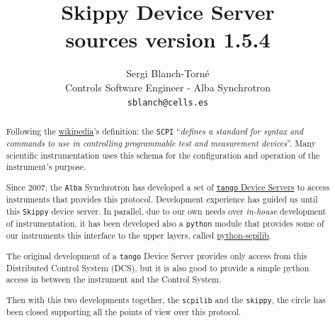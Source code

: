 \documentclass[a4paper,10pt]{article}
\title{Skippy Device Server \\
\large sources version 1.5.4}
\author{Sergi Blanch-Torn\'e\\\small{Controls Software Engineer - Alba Synchrotron}\\{\tt \small{sblanch@cells.es}}}
\begin{document}
\maketitle

\begin{abstract}
Following the \href{https://en.wikipedia.org/wiki/Standard_Commands_for_Programmable_Instruments}{wikipedia}'s definition:  the \texttt{SCPI} ``\emph{defines a standard for syntax and commands to use in controlling programmable test and measurement devices}''. Many scientific instrumentation uses this schema for the configuration and operation of the instrument's purpose.

Since 2007, the \texttt{Alba} Synchrotron has developed a set of \href{http://tango.controls.org}{\texttt{tango} Device Servers} to access instruments that provides this protocol. Development experience has guided us until this \texttt{Skippy} device server. In parallel, due to our own needs over \emph{in-house} development of instrumentation, it has been developed also a \texttt{python} module that provides some of our instruments this interface to the upper layers, called \href{https://github.com/srgblnch/python-scpilib}{python-scpilib}.

The original development of a \texttt{tango} Device Server provides only access from this Distributed Control System (DCS), but it is also good to provide a simple python access in between the instrument and the Control System.

Then with this two developments together, the \texttt{scpilib} and the \texttt{skippy}, the circle has been closed supporting all the points of view over this protocol.


\end{abstract}
\end{document}
